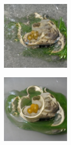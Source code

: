 \documentclass{article}
\begin{document}
\begin{figure}
\begin{subfigure}[b]{0.5\linewidth}
\begin{subfigure}[b]{0.242\linewidth}
        \end{subfigure}
        \hfill
    \end{subfigure}%
    \begin{subfigure}[b]{0.5\linewidth}
        \begin{subfigure}[b]{0.242\linewidth}
        \includegraphics[width=\linewidth]{figures/imagenet128/solver_samples/imagenet128_fm_ot_101_05.png}
        \end{subfigure}
        \begin{subfigure}[b]{0.242\linewidth}
        \includegraphics[width=\linewidth]{figures/imagenet128/solver_samples/imagenet128_fm_ot_101_10.png}

\end{subfigure}
\end{subfigure}
\end{figure}
\end{document}
